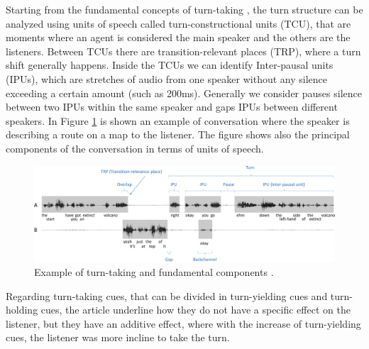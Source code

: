\documentclass[../main.tex]{subfiles}
\begin{document}
Starting from the fundamental concepts of turn-taking \cite{sacks1978simplest}, the turn structure can be analyzed using units of speech called turn-constructional units (TCU), that are moments where an agent is considered the main speaker and the others are the listeners. Between TCUs there are transition-relevant places (TRP), where a turn shift generally happens. Inside the TCUs we can identify Inter-pausal units (IPUs), which are stretches of audio from one speaker without any silence exceeding a certain amount (such as 200ms). Generally we consider pauses silence between two IPUs within the same speaker and gaps IPUs between different speakers. In Figure \ref{fig:TPUs} is shown an example of conversation where the speaker is describing a route on a map to the listener. The figure shows also the principal components of the conversation in terms of units of speech. 

\begin{figure}[ht]
    \centering
    \includegraphics[width=\textwidth]{images/TPUs.png}
    \caption{Example of turn-taking and fundamental components \cite{anderson1991hcrc}.}
    \label{fig:TPUs}
\end{figure}


Regarding turn-taking cues, that can be divided in turn-yielding cues and turn-holding cues, the article underline how they do not have a specific effect on the listener, but they have an additive effect, where with the increase of turn-yielding cues, the listener was more incline to take the turn. 
\end{document}
